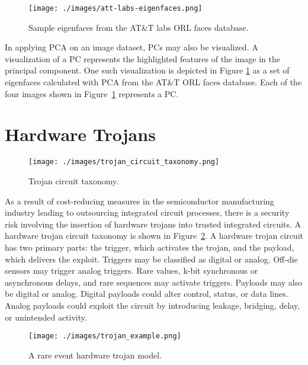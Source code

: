 \begin{figure}[H]
    \texttt{[image: ./images/att-labs-eigenfaces.png]}
    \caption{Sample eigenfaces from the AT\&T labs ORL faces database\cite{lee2019portraits}.}
    \label{fig:eigenfaces}
\end{figure}

In applying PCA on an image dataset, PCs may also be visualized. A visualization
of a PC represents the highlighted features of the image in the principal
component. One such visualization is depicted in Figure \ref{fig:eigenfaces} as
a set of eigenfaces calculated with PCA from the AT\&T ORL faces database. Each
of the four images shown in Figure~\ref{fig:eigenfaces} represents a
PC\cite{139758, lee2019portraits}.


\section {Hardware Trojans}

\begin{figure}[H]
    \texttt{[image: ./images/trojan\_circuit\_taxonomy.png]}
    \caption{Trojan circuit taxonomy\cite{4484928}.}
    \label{fig:hw_trojan_circuit_taxonomy}
\end{figure}

As a result of cost-reducing measures in the semiconductor manufacturing
industry leading to outsourcing integrated circuit processes, there is a
security risk involving the insertion of hardware trojans into trusted
integrated circuits. A hardware trojan circuit taxonomy is shown in
Figure~\ref{fig:hw_trojan_circuit_taxonomy}. A hardware trojan circuit has two
primary parts: the trigger, which activates the trojan, and the payload, which
delivers the exploit. Triggers may be classified as digital or analog. Off-die
sensors may trigger analog triggers. Rare values, k-bit synchronous or
asynchronous delays, and rare sequences may activate triggers. Payloads may also
be digital or analog. Digital payloads could alter control, status, or data
lines. Analog payloads could exploit the circuit by introducing leakage,
bridging, delay, or unintended activity\cite{4484928}.

\begin{figure}[h]
    \texttt{[image: ./images/trojan\_example.png]}
    \caption{A rare event hardware trojan model\cite{4484928}.}
    \label{fig:hw_trojan_eample}
\end{figure}

